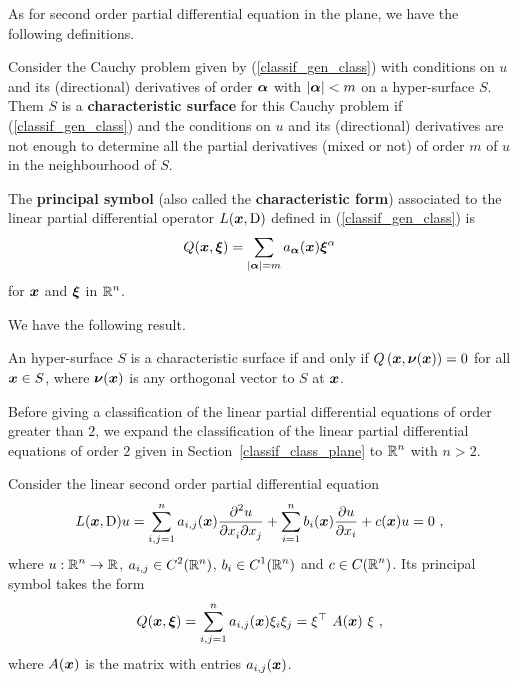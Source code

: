 As for second order partial differential equation in the plane, we
have the following definitions.

\begin{defn} \label{char_surf_hd_def}
Consider the Cauchy problem given by (\ref{classif_gen_class}) with
conditions on $u$ and its (directional) derivatives of order $\VEC{\alpha}$
with $|\VEC{\alpha}|<m$ on a hyper-surface $S$.  Them $S$ is a
{\bfseries characteristic surface}
for this Cauchy problem if (\ref{classif_gen_class}) and the
conditions on $u$ and its (directional) derivatives are not
enough to determine all the partial derivatives (mixed or not) of
order $m$ of $u$ in the neighbourhood of $S$.
\end{defn}

\begin{defn}
The {\bfseries principal symbol} (also called the
{\bfseries characteristic form})
associated to the linear partial differential operator
$\DS L(\VEC{x}, \diff)$ defined in
(\ref{classif_gen_class}) is
\begin{equation} \label{classif_gen_princ_symb}
Q(\VEC{x}, \VEC{\xi}) = \sum_{|\VEC{\alpha}|=m}
a_{\VEC{\alpha}}(\VEC{x}) \VEC{\xi}^\alpha
\end{equation}
for $\VEC{x}$ and $\VEC{\xi}$ in $\DS \RR^n$.
\end{defn}

We have the following result.

\begin{prop}
An hyper-surface $S$ is a characteristic surface if and only if
$\DS Q\left(\VEC{x}, \VEC{\nu}(\VEC{x}) \right) = 0$ for all
$\VEC{x} \in S$,
where $\DS \VEC{\nu}(\VEC{x})$ is any orthogonal vector to $S$
at $\VEC{x}$.
\end{prop}

Before giving a classification of the linear partial differential
equations of order greater than $2$, we expand the classification of
the linear partial differential equations of order 
$2$ given in Section~\ref{classif_class_plane} to
$\DS \RR^n$ with $n>2$.

Consider the linear second order partial differential equation
\begin{equation} \label{classif_class_n}
L(\VEC{x}, \diff)u = \sum_{i,j=1}^n a_{i,j}(\VEC{x})
\pdydxnm{u}{x_i}{x_j}{2}{}{} + \sum_{i=1}^n b_i(\VEC{x})
\pdydx{u}{x_i} + c(\VEC{x})u = 0 \ ,
\end{equation}
where $\DS u:\RR^n \rightarrow \RR$,
$\DS a_{i,j} \in C^2(\RR^n)$,
$\DS b_i \in C^1(\RR^n)$ and $\DS c \in C(\RR^n)$.
Its principal symbol takes the form
\begin{equation} \label{classif_princ_symb_n}
Q(\VEC{x}, \VEC{\xi}) = \sum_{i,j=1}^n a_{i,j}(\VEC{x})\xi_i \xi_j
= \xi^\top\ A(\VEC{x})\ \xi \ ,
\end{equation}
where $A(\VEC{x})$ is the \nn matrix with entries $a_{i,j}(\VEC{x})$.

